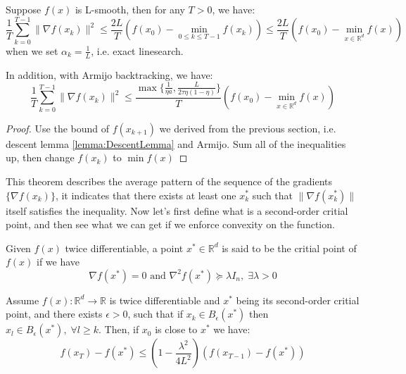 \begin{theorem}\label{thm:NonconvexGradientNormBound}
    Suppose $f(x)$ is L-smooth, then for any $T > 0$, we have:
    \begin{equation*}
        \frac{1}{T}\sum_{k=0}^{T-1}\|\nabla f(x_k) \|^2 \leq \frac{2L}{T}(f(x_0) - \min_{0\leq k \leq T-1}f(x_k)) \leq \frac{2L}{T}(f(x_0) - \min_{x \in \mathbb{R}^d}f(x)) 
    \end{equation*}
    when we set $\alpha_k = \frac{1}{L}$, i.e. exact linesearch.

    In addition, with Armijo backtracking, we have:
    \begin{equation*}
        \frac{1}{T}\sum_{k=0}^{T-1}\|\nabla f(x_k) \|^2 \leq \frac{\max \{ \frac{1}{\eta a}, \frac{L}{2\tau\eta(1-\eta)} \}}{T}(f(x_0) - \min_{x \in \mathbb{R}^d}f(x))
    \end{equation*}
\end{theorem}
\begin{proof}
    Use the bound of $f(x_{k+1})$ we derived from the previous section, i.e. descent lemma \ref{lemma:DescentLemma} and Armijo. Sum all of the inequalities up, then change $f(x_k)$ to $\min f(x)$
\end{proof}

This theorem describes the average pattern of the sequence of the gradients $\{ \nabla f(x_k) \}$, it indicates that there exists at least one $x_k^*$ such that $\| \nabla f(x_k^*) \|$ itself satisfies the inequality. Now let's first define what is a second-order critial point, and then see what we can get if we enforce convexity on the function. 

\begin{definition}
    Given $f(x)$ twice differentiable, a point $x^* \in \mathbb{R}^d$ is said to be the critial point of $f(x)$ if we have 
    \begin{equation*}
        \nabla f(x^*) = 0 \text{ and } \nabla^2f(x^*) \succeq \lambda I_n, \;\exists \lambda > 0
    \end{equation*}
\end{definition}

\begin{theorem}
    Assume $f(x) : \mathbb{R}^d \rightarrow \mathbb{R}$ is twice differentiable and $x^*$ being its second-order critial point, and there exists $\epsilon > 0$, such that if $x_k \in B_\epsilon(x^*)$ then $x_l \in B_\epsilon(x^*),\;\forall l \geq k$. Then, if $x_0$ is close to $x^*$ we have:
    \begin{equation*}
        f(x_T) - f(x^*) \leq (1 - \frac{\lambda^2}{4L^2})(f(x_{T-1}) - f(x^*))
    \end{equation*}
\end{theorem}


